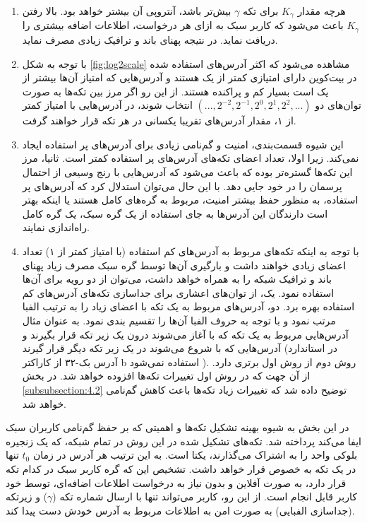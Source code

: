 \begin{enumerate}
	\item{%
		هرچه مقدار $K_\gamma$ برای تکه $\gamma$ بیش‌تر باشد، آنتروپی آن بیشتر خواهد بود. بالا رفتن $K_\gamma$ باعث می‌شود که کاربر سبک به ازای هر درخواست، اطلاعات اضافه بیشتری را دریافت نماید. در نتیجه پهنای باند و ترافیک زیادی مصرف نماید. 	
	}
	\item{%
		با توجه به شکل \ref{fig:log2scale} مشاهده می‌شود که اکثر آدرس‌های استفاده شده در بیت‌کوین دارای امتیازی کمتر از یک هستند و آدرس‌هایی که امتیاز آن‌ها بیشتر از یک است بسیار کم و پراکنده هستند. از این رو اگر مرز بین تکه‌‌ها به صورت توان‌های دو
		$(..., 2^{-2}, 2^{-1}, 2^{0}, 2^{1}, 2^{2},...)$
		انتخاب شوند، در آدرس‌هایی با امتیاز کمتر از ۱، مقدار آدرس‌های تقریبا یکسانی در هر تکه قرار خواهند گرفت.
	}
	\item{%
		این شیوه قسمت‌بندی، امنیت و گم‌نامی زیادی برای آدرس‌های پر استفاده ایجاد نمی‌کند. زیرا اولا، تعداد اعضای تکه‌های آدرس‌های پر استفاده کمتر است. ثانیا، مرز این تکه‌ها گستره‌تر بوده که باعث می‌شود که آدرس‌هایی با رنج وسیعی از احتمال پرسمان را در خود جایی دهد. با این حال می‌توان استدلال کرد که آدرس‌های پر استفاده، به منظور حفظ بیشتر امنیت، مربوط به گره‌های کامل هستند یا اینکه بهتر است دارندگان این آدرس‌ها به جای استفاده از یک گره سبک،  یک گره کامل راه‌اندازی نمایند. 
	}
	\item{%
		با توجه به اینکه تکه‌های مربوط به آدرس‌های کم استفاده (با امتیاز کمتر از ۱) تعداد اعضای زیادی خواهند داشت و بارگیری آن‌ها توسط گره سبک مصرف زیاد پهنای باند و ترافیک شبکه را به همراه خواهد داشت، می‌توان از دو رویه برای آن‌ها استفاده نمود. یک، از توان‌های اعشاری برای جداسازی تکه‌های آدرس‌های کم‌ استفاده بهره برد. دو، آدرس‌های مربوط به یک تکه با اعضای زیاد را به ترتیب الفبا مرتب نمود و با توجه به حروف الفبا آن‌ها را تقسیم بندی نمود. به عنوان مثال آدرس‌هایی مربوط به یک تکه که با
		آغاز می‌شوند درون یک زیر تکه قرار بگیرند و آدرس‌هایی که با  شروع می‌شوند در یک زیر تکه دیگر قرار گیرند (در استاندارد آدرس بک-۳۲  از کاراکتر b استفاده نمی‌شود \cite{Wuille2017}). روش دوم از روش اول برتری دارد. از آن جهت که در روش اول تغییرات تکه‌ها افزوده خواهد شد. در بخش \ref{subsubsection:4.2} توضیح داده شد که تغییرات زیاد تکه‌ها باعث کاهش گم‌نامی خواهد شد.
	}
	
\end{enumerate}
در این بخش به شیوه بهینه تشکیل تکه‌ها و اهمیتی که بر حفظ گم‌نامی کاربران سبک ایفا می‌کند پرداخته شد. تکه‌های تشکیل شده در این روش در تمام شبکه، که یک زنجیره بلوکی واحد را به اشتراک می‌گذارند، یکتا است. به این ترتیب هر آدرس  در زمان $t_0$ تنها در یک تکه به خصوص قرار خواهد داشت. تشخیص این که گره کاربر سبک در کدام تکه قرار دارد، به صورت آفلاین و بدون نیاز به درخواست اطلاعات اضافه‌ای، توسط خود کاربر قابل انجام است. از این رو،‌ کاربر می‌تواند تنها با ارسال شماره تکه ($\gamma$) و زیرتکه (جداسازی الفبایی) به صورت امن به اطلاعات مربوط به آدرس خودش دست پیدا کند.


